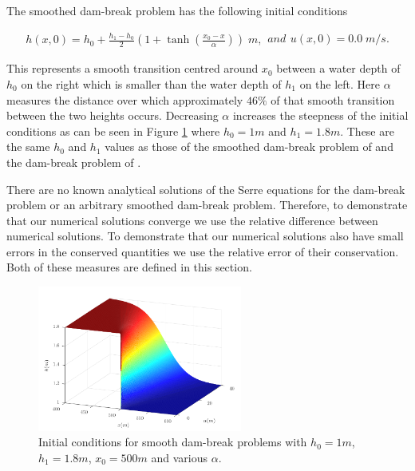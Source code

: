 \documentclass[times]{elsarticle}
\begin{document}
The smoothed dam-break problem has the following initial conditions
\begin{linenomath*}
\begin{subequations}
\begin{gather}
h(x,0) = h_0 + \frac{h_1 - h_0}{2}\left(1 + \tanh\left(\frac{x_0 - x}{\alpha}\right)\right)\; m,
\end{gather} 
and
\begin{gather}
u(x,0) = 0.0 \;m/s.
\end{gather}
\label{eq:sdbi}
\end{subequations}
\end{linenomath*}
This represents a smooth transition centred around $x_0$ between a water depth of $h_0$ on the right which is smaller than the water depth of $h_1$ on the left. Here $\alpha$ measures the distance over which approximately $46\%$ of that smooth transition between the two heights occurs. Decreasing $\alpha$ increases the steepness of the initial conditions as can be seen in Figure \ref{fig:dbsmoothinit} where $h_0=1m$ and $h_1=1.8m$. These are the same $h_0$ and $h_1$ values as those of the smoothed dam-break problem of \citet{El-etal-2006} and the dam-break problem of \citet{Hank-etal-2010-2034}.

There are no known analytical solutions of the Serre equations for the dam-break problem or an arbitrary smoothed dam-break problem. Therefore, to demonstrate that our numerical solutions converge we use the relative difference between numerical solutions. To demonstrate that our numerical solutions also have small errors in the conserved quantities we use the relative error of their conservation. Both of these measures are defined in this section.
\begin{figure}
\centering
\includegraphics[width=0.6\textwidth]{Figure-1.pdf}
\caption{Initial conditions for smooth dam-break problems with $h_0 = 1m$, $h_1 = 1.8m$, $x_0 =500m$ and various $\alpha$.}
\label{fig:dbsmoothinit}
\end{figure}
%
\end{document}
